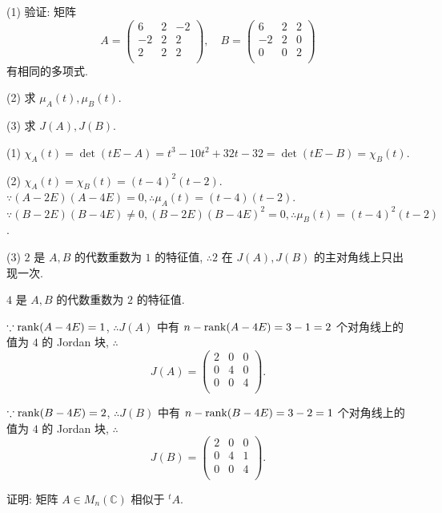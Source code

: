 \documentclass{ctexart}
\begin{document}
\begin{exercise}%
    (1) 验证: 矩阵
    \[A=\begin{pmatrix}
        6 & 2 & -2 \\
        -2 & 2 & 2 \\
        2 & 2 & 2 \\
    \end{pmatrix},\quad B=\begin{pmatrix}
        6 & 2 & 2 \\
        -2 & 2 & 0 \\
        0 & 0 & 2 \\
    \end{pmatrix}\]
    有相同的多项式.

    (2) 求 $\mu_A(t),\mu_B(t)$.

    (3) 求 $J(A),J(B)$.
\end{exercise}
\begin{solution}
    (1) $\chi_A(t)=\det(tE-A)=t^3-10t^2+32t-32=\det(tE-B)=\chi_B(t)$.

    (2) $\chi_A(t)=\chi_B(t)=(t-4)^2(t-2)$. $\because(A-2E)(A-4E)=0,\therefore\mu_A(t)=(t-4)(t-2)$. $\because(B-2E)(B-4E)\neq0,(B-2E)(B-4E)^2=0,\therefore\mu_B(t)=(t-4)^2(t-2)$.

    (3) $2$ 是 $A,B$ 的代数重数为 $1$ 的特征值, $\therefore2$ 在 $J(A),J(B)$ 的主对角线上只出现一次.

    $4$ 是 $A,B$ 的代数重数为 $2$ 的特征值.

    $\because\operatorname{rank} (A-4E)=1$, $\therefore J(A)$ 中有 $n-\operatorname{rank} (A-4E)=3-1=2$ 个对角线上的值为 $4$ 的 Jordan 块, $\therefore$
    \[J(A)=\begin{pmatrix}
        2 & 0 & 0 \\
        0 & 4 & 0 \\
        0 & 0 & 4 \\
    \end{pmatrix}.\]

    $\because\operatorname{rank} (B-4E)=2$, $\therefore J(B)$ 中有 $n-\operatorname{rank} (B-4E)=3-2=1$ 个对角线上的值为 $4$ 的 Jordan 块, $\therefore$
    \[J(B)=\begin{pmatrix}
        2 & 0 & 0 \\
        0 & 4 & 1 \\
        0 & 0 & 4 \\
    \end{pmatrix}.\]
\end{solution}
\begin{exercise}%
    证明: 矩阵 $A\in M_n(\mathbb{C})$ 相似于 $^tA$.
\end{exercise}
\end{document}
